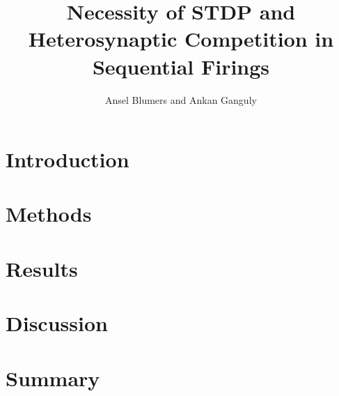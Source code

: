 \documentclass[12pt, final]{article}
\begin{document}
\captionsetup[figure]{font = footnotesize}
\captionsetup[subfigure]{font = scriptsize}

\newcommand{\Pois}{\text{Pois}}

\newtheorem{prop}{Proposition}


\title{Necessity of STDP and Heterosynaptic Competition in Sequential Firings}
\author{Ansel Blumers and Ankan Ganguly}
\maketitle

\begin{abstract}

\end{abstract}

\newpage

\tableofcontents

\newpage

\section{Introduction}



\section{Methods}



\section{Results}



\section{Discussion}



\section{Summary}



\newpage



\end{document}

